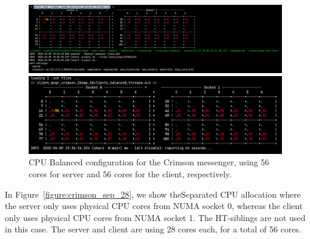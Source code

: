 \begin{figure}[!ht]
  \centering
  \begin{minipage}{.5\textwidth}
  \centering
    \includegraphics[width=\textwidth]{server_msgr_crimson_56smp_56clients_balanced.png}
  \end{minipage}%
  \begin{minipage}{.5\textwidth}
  \centering
    \includegraphics[width=\textwidth]{client_msgr_crimson_56smp_56clients_balanced.png}
  \end{minipage}%
  \caption{CPU Balanced configuration for the Crimson messenger, using 56
  cores for server and 56 cores for the client, respectively.}
  \label{figure:crimson_bal_56}
\end{figure}

In Figure~\ref{figure:crimson_sep_28}, we show theSeparated CPU allocation
where the server only uses physical CPU cores from NUMA socket 0, whereas the
client only uses physical CPU cores from NUMA socket 1. The HT-siblings are not
used in this case. The server and client are using 28 cores each, for a total
of 56 cores.

